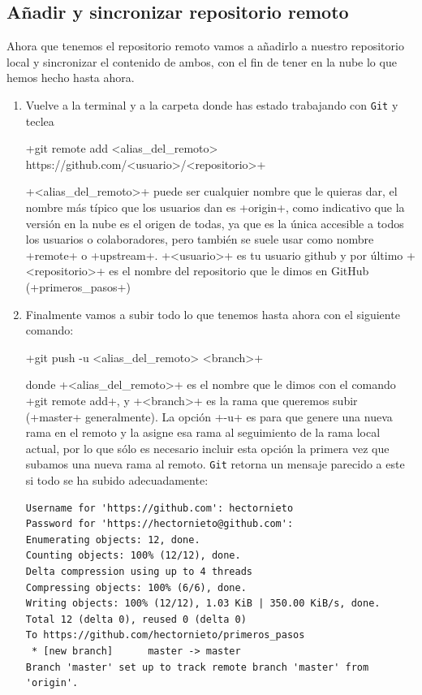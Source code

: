 \documentclass[a5paper, oneside,10pt]{article}
\begin{document}
    \subsection{Añadir y sincronizar repositorio remoto}\label{sec:sincronizar}
      Ahora que tenemos el repositorio remoto vamos a añadirlo a nuestro repositorio local y sincronizar el contenido de ambos, con el fin de tener en la nube lo que hemos hecho hasta ahora. 
      \begin{enumerate}
       \item Vuelve a la terminal y a la carpeta donde has estado trabajando con \verb+Git+ y teclea

        \hspace{-3cm}\cverb+git remote add <alias_del_remoto> https://github.com/<usuario>/<repositorio>+
       
       \cverb+<alias_del_remoto>+ puede ser cualquier nombre que le quieras dar, el nombre más típico que los usuarios dan es \cverb+origin+, como indicativo que la versión en la nube es el origen de todas, ya que es la única accesible a todos los usuarios o colaboradores, pero también se suele usar como nombre \cverb+remote+ o \cverb+upstream+. \cverb+<usuario>+ es tu usuario github y por último \cverb+<repositorio>+ es el nombre del repositorio que le dimos en GitHub (\cverb+primeros_pasos+)
       
       \item Finalmente vamos a subir todo lo que tenemos hasta ahora con el siguiente comando:
       
       \cverb+git push -u <alias_del_remoto> <branch>+
       
       donde \cverb+<alias_del_remoto>+ es el nombre que le dimos con el comando \cverb+git remote add+, y \cverb+<branch>+ es la rama que queremos subir (\cverb+master+ generalmente). La opción \cverb+-u+ es para que genere una nueva rama en el remoto y la asigne esa rama al seguimiento de la rama local actual, por lo que sólo es necesario incluir esta opción la primera vez que subamos una nueva rama al remoto. \verb+Git+ retorna un mensaje parecido a este si todo se ha subido adecuadamente:
       \begin{lstlisting}[style=custom]
Username for 'https://github.com': hectornieto
Password for 'https://hectornieto@github.com': 
Enumerating objects: 12, done.
Counting objects: 100% (12/12), done.
Delta compression using up to 4 threads
Compressing objects: 100% (6/6), done.
Writing objects: 100% (12/12), 1.03 KiB | 350.00 KiB/s, done.
Total 12 (delta 0), reused 0 (delta 0)
To https://github.com/hectornieto/primeros_pasos
 * [new branch]      master -> master
Branch 'master' set up to track remote branch 'master' from 'origin'.
      \end{lstlisting}
      

\end{enumerate}
\end{document}
